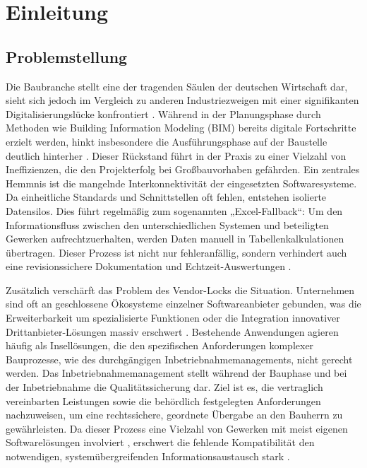 \section{Einleitung}
\subsection{Problemstellung} \label{sec:problemstellung}
Die Baubranche stellt eine der tragenden Säulen der deutschen Wirtschaft dar, sieht sich jedoch
im Vergleich zu anderen Industriezweigen mit einer signifikanten Digitalisierungslücke konfrontiert \cite[Kap.~2.5]{BBSR}.
Während in der Planungsphase durch Methoden wie Building Information Modeling (BIM) bereits digitale
Fortschritte erzielt werden, hinkt insbesondere die Ausführungsphase auf der Baustelle deutlich hinterher \cite[Kap.~3.2]{bertschek2019zukunft}.
Dieser Rückstand führt in der Praxis zu einer Vielzahl von Ineffizienzen, die den Projekterfolg bei
Großbauvorhaben gefährden.
Ein zentrales Hemmnis ist die mangelnde Interkonnektivität der eingesetzten Softwaresysteme.
Da einheitliche Standards und Schnittstellen oft fehlen, entstehen isolierte Datensilos.
Dies führt regelmäßig zum sogenannten „Excel-Fallback“:
Um den Informationsfluss zwischen den unterschiedlichen Systemen und beteiligten Gewerken aufrechtzuerhalten,
werden Daten manuell in Tabellenkalkulationen übertragen. Dieser Prozess ist nicht nur fehleranfällig,
sondern verhindert auch eine revisionssichere Dokumentation und Echtzeit-Auswertungen \cite[Kap.~4.1]{feth2023studie}.

Zusätzlich verschärft das Problem des Vendor-Locks die Situation.
Unternehmen sind oft an geschlossene Ökosysteme einzelner Softwareanbieter gebunden,
was die Erweiterbarkeit um spezialisierte Funktionen oder die Integration innovativer Drittanbieter-Lösungen massiv erschwert \cite[Kap.~1]{feth2023studie}.
Bestehende Anwendungen agieren häufig als Insellösungen, die den spezifischen Anforderungen komplexer Bauprozesse, wie des durchgängigen Inbetriebnahmemanagements, nicht gerecht werden.
Das Inbetriebnahmemanagement stellt während der Bauphase und bei der Inbetriebnahme die Qualitätssicherung dar. Ziel ist es, die vertraglich vereinbarten Leistungen sowie die behördlich festgelegten Anforderungen nachzuweisen,
um eine rechtssichere, geordnete Übergabe an den Bauherrn zu gewährleisten. Da dieser Prozess eine Vielzahl von Gewerken mit meist eigenen Softwarelösungen involviert \cite[Kap.~4.1]{feth2023studie},
erschwert die fehlende Kompatibilität den notwendigen, systemübergreifenden Informationsaustausch stark \cite[Kap.~4.2]{BBSR}.
